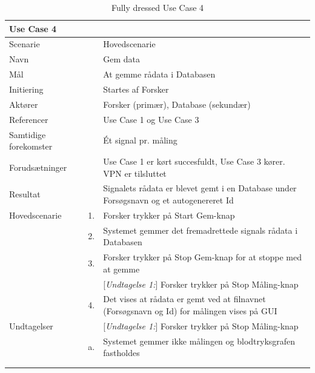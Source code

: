 \begin{longtabu} to  %
    {\large \textbf{Use Case 4}} && \\
    \toprule
    Scenarie 		&& Hovedscenarie\\
    Navn 			&& Gem data\\
    Mål 			&& At gemme rådata i Databasen\\
    Initiering 		&& Startes af Forsker\\
    Aktører 		&& Forsker (primær), Database (sekundær)\\
    Referencer 		&& Use Case 1 og Use Case 3 \\
    Samtidige forekomster  &&  Ét signal pr. måling\\
    Forudsætninger 	&& Use Case 1 er kørt succesfuldt, Use Case 3 kører. VPN er tilsluttet\\
    Resultat 		&& Signalets rådata er blevet gemt i en Database under Forsøgsnavn og et autogenereret Id\\ \midrule
    Hovedscenarie &    1. &		Forsker trykker på Start Gem-knap\\[-1ex] 
    &	2. & Systemet gemmer det fremadrettede signals rådata i Databasen\\
                  &    3. &  Forsker trykker på Stop Gem-knap for at stoppe med at gemme\\
    &	&			[\textit{Undtagelse 1:}] Forsker trykker på Stop Måling-knap\\
                    &    4. &   Det vises at rådata er gemt ved at filnavnet (Forsøgsnavn og Id) for målingen vises på GUI \\ \midrule	 	
 Undtagelser &    & [\textit{Undtagelse 1:}] Forsker trykker på Stop Måling-knap\\
 & a. 	&  Systemet gemmer ikke målingen og blodtryksgrafen fastholdes\\  

 \\ \bottomrule
\caption{Fully dressed Use Case 4}
\label{UC4}
\end{longtabu}


